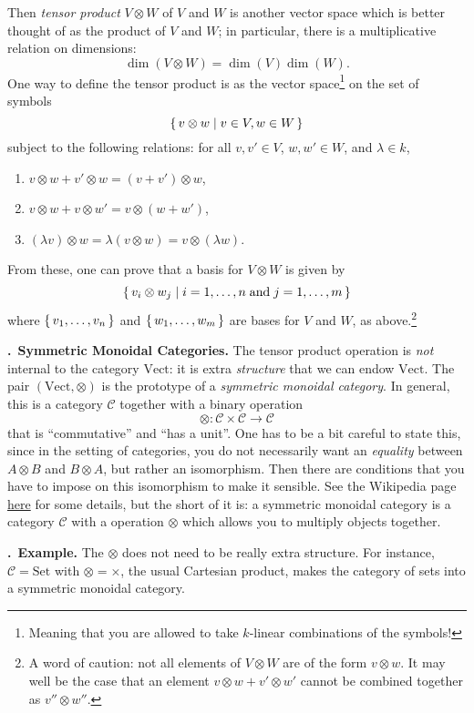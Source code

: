 \documentclass[11pt,noamsfonts]{amsart}
\newcommand{\pointheader}{\vspace{2mm}\noindent\refstepcounter{section}\textbf{\thesection.}}
\newcommand{\bpoint}[1]{\pointheader~{\bf #1.}}
\begin{document}
Then \emph{tensor product} \(V \otimes W\) of \(V\) and \(W\) is another vector
space which is better thought of as the product of \(V\) and \(W\); in
particular, there is a multiplicative relation on dimensions:
\[ \dim(V \otimes W) = \dim(V) \dim(W). \]
One way to define the tensor product is as the vector space\footnote{Meaning that
you are allowed to take \(k\)-linear combinations of the symbols!} on the set
of symbols
\[ \set{v \otimes w | v \in V, w \in W} \]
subject to the following relations: for all \(v, v' \in V\), \(w, w' \in W\),
and \(\lambda \in k\),
\begin{enumerate}
\item \(v \otimes w + v' \otimes w = (v + v') \otimes w\),
\item \(v \otimes w + v \otimes w' = v \otimes (w + w')\),
\item \((\lambda v) \otimes w = \lambda (v \otimes w) = v \otimes (\lambda w)\).
\end{enumerate}
From these, one can prove that a basis for \(V \otimes W\) is given by
\[ \set{v_i \otimes w_j | i = 1,\ldots,n \;\text{and}\; j = 1,\ldots,m } \]
where \(\set{v_1,\ldots,v_n}\) and \(\set{w_1,\ldots,w_m}\) are bases for \(V\)
and \(W\), as above.\footnote{A word of caution: not all elements of
\(V \otimes W\) are of the form \(v \otimes w\). It may well be the case that
an element \(v \otimes w + v' \otimes w'\)  cannot be combined together as
\(v'' \otimes w''\).}

\bpoint{Symmetric Monoidal Categories}
The tensor product operation is \emph{not} internal to the category
\(\mathrm{Vect}\): it is extra \emph{structure} that we can endow
\(\mathrm{Vect}\). The pair \((\mathrm{Vect}, \otimes)\) is the prototype of
a \emph{symmetric monoidal category}. In general, this is a category \(\mathcal{C}\)
together with a binary operation
\[ \otimes \colon \mathcal{C} \times \mathcal{C} \to \mathcal{C} \]
that is ``commutative'' and ``has a unit''. One has to be a bit careful to state
this, since in the setting of categories, you do not necessarily want an \emph{equality}
between \(A \otimes B\) and \(B \otimes A\), but rather an isomorphism. Then there
are conditions that you have to impose on this isomorphism to make it sensible.
See the Wikipedia page \href{https://en.wikipedia.org/wiki/Symmetric_monoidal_category}{here}
for some details, but the short of it is:
a symmetric monoidal category is a category \(\mathcal{C}\) with a operation
\(\otimes\) which allows you to multiply objects together.

\bpoint{Example}
The \(\otimes\) does not need to be really extra structure. For instance,
\(\mathcal{C} = \mathrm{Set}\) with \(\otimes = \times\), the usual Cartesian
product, makes the category of sets into a symmetric monoidal category.
\end{document}
